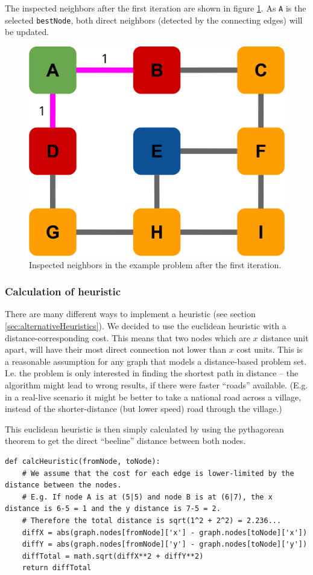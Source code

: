 \documentclass[12pt]{article}
\begin{document}
The inspected neighbors after the first iteration are shown in figure \ref{fig:neighbors}. As \texttt{A} is the selected \texttt{bestNode}, both direct neighbors (detected by the connecting edges) will be updated.
\begin{figure}[H]
	\centering
	\includegraphics[width=0.7\linewidth]{sources/neighbors}
	\caption{Inspected neighbors in the example problem after the first iteration.}
	\label{fig:neighbors}
\end{figure}	

\subsubsection{Calculation of heuristic}
\label{sec:calcHeuristic}
There are many different ways to implement a heuristic (see section \ref{sec:alternativeHeuristics}).
We decided to use the euclidean heuristic with a distance-corresponding cost.
This means that two nodes which are $x$ distance unit apart, will have their most direct connection not lower than $x$ cost units.
This is a reasonable assumption for any graph that models a distance-based problem set.
I.e. the problem is only interested in finding the shortest path in distance -- the algorithm might lead to wrong results, if there were faster \enquote{roads} available. 
(E.g. in a real-live scenario it might be better to take a national road across a village, instead of the shorter-distance (but lower speed) road through the village.)

This euclidean heuristic is then simply calculated by using the pythagorean theorem to get the direct \enquote{beeline} distance between both nodes.

\begin{lstlisting}
def calcHeuristic(fromNode, toNode):
	# We assume that the cost for each edge is lower-limited by the distance between the nodes.
	# E.g. If node A is at (5|5) and node B is at (6|7), the x distance is 6-5 = 1 and the y distance is 7-5 = 2.
	# Therefore the total distance is sqrt(1^2 + 2^2) = 2.236...
	diffX = abs(graph.nodes[fromNode]['x'] - graph.nodes[toNode]['x'])
	diffY = abs(graph.nodes[fromNode]['y'] - graph.nodes[toNode]['y'])
	diffTotal = math.sqrt(diffX**2 + diffY**2)
	return diffTotal
\end{lstlisting}
\end{document}
